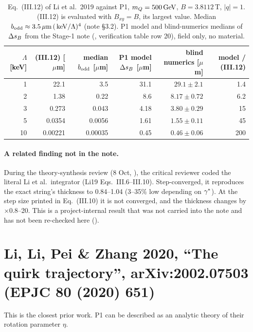 \documentclass[11pt]{article}
\begin{document}
\begin{table}[htbp]
\centering\small
\caption{Eq.~(III.12) of Li et al.\ 2019 against P1, $m_Q=500\,\mathrm{GeV}$, $B=3.8112$\,T, $|q|=1$. (III.12) is evaluated with
$B_{xy}=B$, its largest value. Median $b_{\rm odd}\approx3.5\,\mu\mathrm{m}\,(\,\mathrm{keV}/\Lambda)^4$ (note \S3.2). P1 model and blind-numerics medians
of $\Delta s_B$ from the Stage-1 note (, verification table row 20), field only, no material.}
\label{tab:li19}
\begin{tabular}{rrrrrr}
\toprule
$\Lambda$ [keV] & (III.12) [$\mu$m] & median $b_{\rm odd}$ [$\mu$m] & P1 model $\Delta s_B$ [$\mu$m] & blind numerics [$\mu$m] & model / (III.12)\\
\midrule
1  & 22.1    & 3.5      & 31.1 & $29.1\pm2.1$  & 1.4\\
2  & 1.38    & 0.22     & 8.6  & $8.17\pm0.72$ & 6.2\\
3  & 0.273   & 0.043    & 4.18 & $3.80\pm0.29$ & 15\\
5  & 0.0354  & 0.0056   & 1.61 & $1.55\pm0.11$ & 45\\
10 & 0.00221 & 0.00035  & 0.45 & $0.46\pm0.06$ & 200\\
\bottomrule
\end{tabular}
\end{table}

\paragraph{A related finding not in the note.} During the theory-synthesis review (8 Oct, ),
the critical reviewer coded the literal Li et al.\ integrator (Li19 Eqs.~III.6--III.10). Step-converged, it reproduces
the exact string's thickness to 0.84--1.04 (3--35\% low depending on $\gamma^*$). At the step size printed in Eq.~(III.10)
it is not converged, and the thickness changes by $\times0.8$--20. This is a project-internal result that was not carried into
the note and has not been re-checked here (\EST{}).

\section{Li, Li, Pei \& Zhang 2020, ``The quirk trajectory'', arXiv:2002.07503 (EPJC 80 (2020) 651)}\label{sec:li20}

This is the closest prior work. P1 can be described as an analytic theory of their rotation parameter $\eta$.
\end{document}
